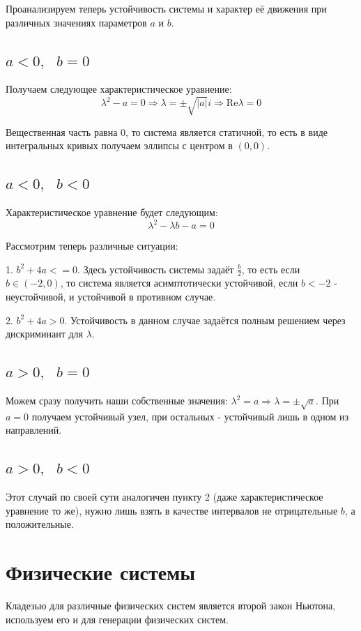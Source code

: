 \documentclass[a4paper,14pt]{extarticle}
\begin{document}
	Проанализируем теперь устойчивость системы и характер её движения при различных значениях параметров $a$ и $b$.
	
	\subsection{$a<0, \text{ } b = 0$}
	Получаем следующее характеристическое уравнение:
	$$
	\lambda^2-a=0 \Rightarrow \lambda=\pm\sqrt{|a|}i \Rightarrow \text{Re}\lambda=0
	$$
	
	Вещественная часть равна 0, то система является статичной, то есть в виде интегральных кривых получаем эллипсы с центром в $(0, 0)$.
	
	\subsection{$a<0, \text{ } b < 0$}
	Характеристическое уравнение будет следующим:
	$$
	\lambda^2-\lambda b - a = 0
	$$
	
	Рассмотрим теперь различные ситуации:
	
	1. $b^2+4a <= 0$. Здесь устойчивость системы задаёт $\frac{b}{2}$, то есть если $b\in(-2, 0)$, то система является асимптотически устойчивой, если $b<-2$ - неустойчивой, и устойчивой в противном случае.
	
	2. $b^2+4a > 0$. Устойчивость в данном случае задаётся полным решением через дискриминант для $\lambda$.
	
	\subsection{$a>0, \text{ } b = 0$}
	Можем сразу получить наши собственные значения: $\lambda^2=a\Rightarrow\lambda=\pm\sqrt{a}$. При $a = 0$ получаем устойчивый узел, при остальных - устойчивый лишь в одном из направлений.
	
	\subsection{$a>0, \text{ } b < 0$}
	Этот случай по своей сути аналогичен пункту 2 (даже характеристическое уравнение то же), нужно лишь взять в качестве интервалов не отрицательные $b$, а положительные.
	
	\section{Физические системы}
	Кладезью для различные физических систем является второй закон Ньютона, используем его и для генерации физических систем.
\end{document}
